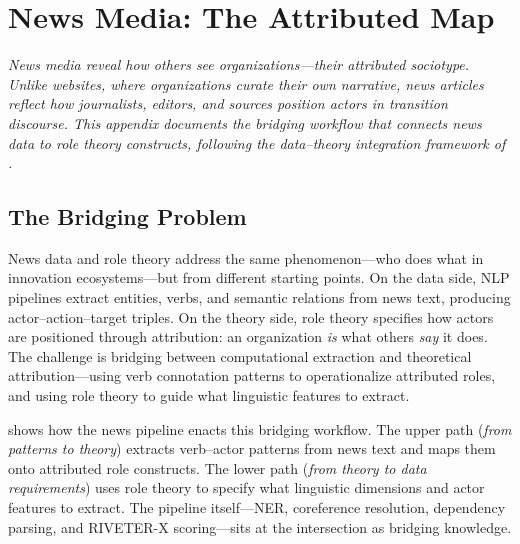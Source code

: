\documentclass[../main.tex]{subfiles}
\begin{document}

\chapter{News Media: The Attributed Map}
\label{app:news-media}

\noindent\textit{News media reveal how others see organizations---their attributed sociotype.
Unlike websites, where organizations curate their own narrative,
news articles reflect how journalists, editors, and sources position actors
in transition discourse.
This appendix documents the bridging workflow that connects news data
to role theory constructs, following the data--theory integration framework
of \textcite{maass2018data}.}

\bigskip


\section{The Bridging Problem}

News data and role theory address the same phenomenon---who does what
in innovation ecosystems---but from different starting points.
On the data side, NLP pipelines extract entities, verbs, and
semantic relations from news text, producing actor--action--target triples.
On the theory side, role theory specifies how actors are positioned
through attribution: an organization \emph{is} what others \emph{say} it does.
The challenge is bridging between computational extraction
and theoretical attribution---using verb connotation patterns
to operationalize attributed roles, and using role theory
to guide what linguistic features to extract.

 shows how the \RoleBox{} news pipeline
enacts this bridging workflow.
The upper path (\textit{from patterns to theory}) extracts verb--actor
patterns from news text and maps them onto attributed role constructs.
The lower path (\textit{from theory to data requirements}) uses role
theory to specify what linguistic dimensions and actor features to extract.
The pipeline itself---NER, coreference resolution, dependency parsing,
and RIVETER-X scoring---sits at the intersection as bridging knowledge.
\end{document}
